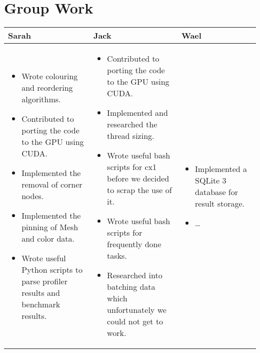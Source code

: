 \section*{Group Work}
\begin{tabular}{|p{5.5cm}| p{5.5cm} | p{5.5cm} |}
  \hline
  Sarah & Jack & Wael\\
  \hline
  \hline
  \begin{itemize}
    \item Wrote colouring and reordering algorithms.
    \item Contributed to porting the code to the GPU using CUDA.
    \item Implemented the removal of corner nodes.
    \item Implemented the pinning of Mesh and color data.
    \item Wrote useful Python scripts to parse profiler results and benchmark results.
  \end{itemize} &

  \begin{itemize}
    \item Contributed to porting the code to the GPU using CUDA.
    \item Implemented and researched the thread sizing.
    \item Wrote useful bash scripts for cx1 before we decided to scrap the use of it.
    \item Wrote useful bash scripts for frequently done tasks.
    \item Researched into batching data which unfortunately we could not get to work.
  \end{itemize} &

  \begin{itemize}
    \item Implemented a SQLite 3 database for result storage.
    \item \ldots
  \end{itemize} \\
  \hline
\end{tabular}
